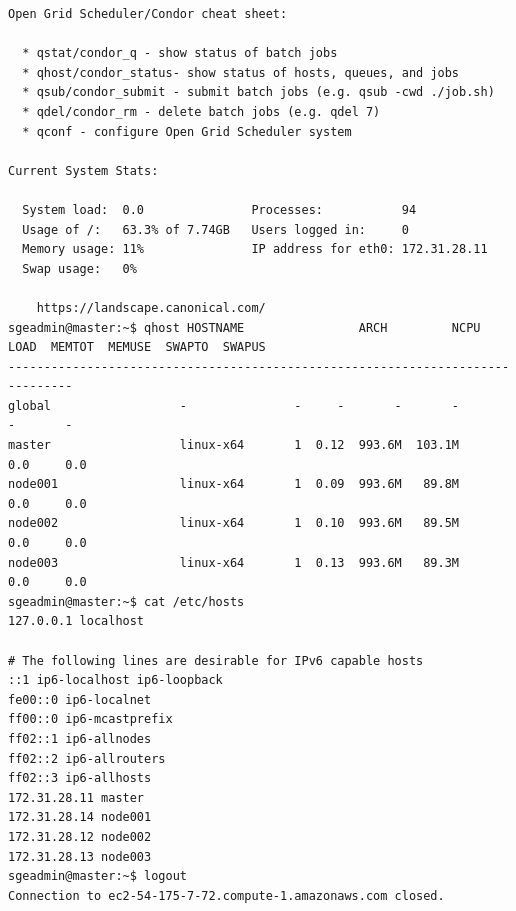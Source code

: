 \documentclass{article}
\begin{document}
\begin{lstlisting}[style=miniBash]
Open Grid Scheduler/Condor cheat sheet:

  * qstat/condor_q - show status of batch jobs
  * qhost/condor_status- show status of hosts, queues, and jobs
  * qsub/condor_submit - submit batch jobs (e.g. qsub -cwd ./job.sh)
  * qdel/condor_rm - delete batch jobs (e.g. qdel 7)
  * qconf - configure Open Grid Scheduler system

Current System Stats:

  System load:  0.0               Processes:           94
  Usage of /:   63.3% of 7.74GB   Users logged in:     0
  Memory usage: 11%               IP address for eth0: 172.31.28.11
  Swap usage:   0%

    https://landscape.canonical.com/
sgeadmin@master:~$ qhost HOSTNAME                ARCH         NCPU  LOAD  MEMTOT  MEMUSE  SWAPTO  SWAPUS
-------------------------------------------------------------------------------
global                  -               -     -       -       -       -       -
master                  linux-x64       1  0.12  993.6M  103.1M     0.0     0.0
node001                 linux-x64       1  0.09  993.6M   89.8M     0.0     0.0
node002                 linux-x64       1  0.10  993.6M   89.5M     0.0     0.0
node003                 linux-x64       1  0.13  993.6M   89.3M     0.0     0.0
sgeadmin@master:~$ cat /etc/hosts
127.0.0.1 localhost

# The following lines are desirable for IPv6 capable hosts
::1 ip6-localhost ip6-loopback
fe00::0 ip6-localnet
ff00::0 ip6-mcastprefix
ff02::1 ip6-allnodes
ff02::2 ip6-allrouters
ff02::3 ip6-allhosts
172.31.28.11 master
172.31.28.14 node001
172.31.28.12 node002
172.31.28.13 node003
sgeadmin@master:~$ logout
Connection to ec2-54-175-7-72.compute-1.amazonaws.com closed.
\end{lstlisting}
\end{document}
